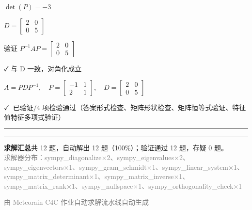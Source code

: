 \documentclass[12pt, a4paper]{article}
\newcommand{\verifyok}{\textcolor{solutiongreen}{\ensuremath{\checkmark}\ 已验证}}
\begin{document}
\begin{stepbox}
$\det(P) = -3$
\end{stepbox}

\begin{stepbox}
$D = \left[\begin{matrix}2 & 0\\0 & 5\end{matrix}\right]$
\end{stepbox}

\begin{stepbox}
验证 $P^{-1}AP = \left[\begin{matrix}2 & 0\\0 & 5\end{matrix}\right]$
\end{stepbox}

\begin{stepbox}
✓ 与 D 一致，对角化成立
\end{stepbox}

\begin{center}
$\boxed{A = PDP^{-1},\quad P = \left[\begin{matrix}-1 & 1\\2 & 1\end{matrix}\right],\quad D = \left[\begin{matrix}2 & 0\\0 & 5\end{matrix}\right]}$
\end{center}

\begin{verifybox}\small \verifyok{}/4 项检验通过（答案形式检查、矩阵形状检查、矩阵恒等式验证、特征值特征多项式验证） \end{verifybox}

\vspace{0.8em}\hrule\vspace{0.8em}

\vspace{1.5em}
\hrule\vspace{0.8em}
\begin{center}\small
\textbf{求解汇总}\quad 共 12 题，自动解出 12 题（100\%）；验证通过 12 题，存疑 0 题。\\[0.3em]
\textcolor{gray}{求解器分布：sympy\_diagonalize×2、sympy\_eigenvalues×2、sympy\_eigenvectors×1、sympy\_gram\_schmidt×1、sympy\_linear\_system×1、sympy\_matrix\_determinant×1、sympy\_matrix\_inverse×1、sympy\_matrix\_rank×1、sympy\_nullspace×1、sympy\_orthogonality\_check×1}
\end{center}
\vfill\begin{center}\footnotesize\textcolor{gray}{由 Meteorain C4C 作业自动求解流水线自动生成}\end{center}
\end{document}
